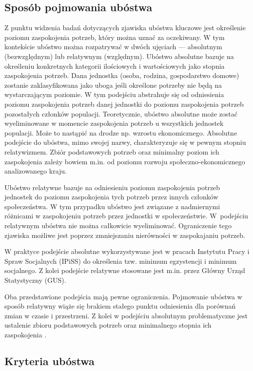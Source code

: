 \subsection{Sposób pojmowania ubóstwa}

Z punktu widzenia badań dotyczących zjawiska ubóstwa kluczowe jest określenie poziomu zaspokojenia potrzeb, który można uznać za oczekiwany. W tym kontekście ubóstwo można rozpatrywać w dwóch ujęciach --- absolutnym (bezwzględnym) lub relatywnym (względnym). Ubóstwo absolutne bazuje na określeniu konkretnych kategorii ilościowych i wartościowych jako stopnia zaspokojenia potrzeb. Dana jednostka (osoba, rodzina, gospodarstwo domowe) zostanie zaklasyfikowana jako uboga jeśli określone potrzeby nie będą na wystarczającym poziomie. W tym podejściu abstrahuje się od odniesienia poziomu zaspokojenia potrzeb danej jednostki do poziomu zaspokojenia potrzeb pozostałych członków populacji. Teoretycznie, ubóstwo absolutne może zostać wyeliminowane w momencie zaspokojenia potrzeb u wszystkich jednostek populacji. Może to nastąpić na drodze np. wzrostu ekonomicznego. Absolutne podejście do ubóstwa, mimo swojej nazwy, charakteryzuje się w pewnym stopniu relatywizmem. Zbiór podstawowych potrzeb oraz minimalny poziom ich zaspokojenia zależy bowiem m.in. od poziomu rozwoju społeczno-ekonomicznego analizowanego kraju.

Ubóstwo relatywne bazuje na odniesieniu poziomu zaspokojenia potrzeb jednostek do poziomu zaspokojenia tych potrzeb przez innych członków społeczeństwa. W tym przypadku ubóstwo jest związane z nadmiernymi różnicami w zaspokojeniu potrzeb przez jednostki w społeczeństwie. W~podejściu relatywnym ubóstwa nie można całkowicie wyeliminować. Ograniczenie tego zjawiska możliwe jest poprzez zmniejszaniu nierówności w zaspokajaniu potrzeb.

W praktyce podejście absolutne wykorzystywane jest w pracach Instytutu Pracy i Spraw Socjalnych (IPiSS) do określenia tzw. minimum egzystencji i minimum socjalnego. Z kolei podejście relatywne stosowane jest m.in. przez Główny Urząd Statystyczny (GUS).

Oba przedstawione podejścia mają pewne ograniczenia. Pojmowanie ubóstwa w sposób relatywny wiąże się brakiem stałego punktu odniesienia dla porównań zmian w czasie i przestrzeni. Z kolei w podejściu absolutnym problematyczne jest ustalenie zbioru podstawowych potrzeb oraz minimalnego stopnia ich zaspokojenia \citep{panek2013}.

\subsection{Kryteria ubóstwa}

